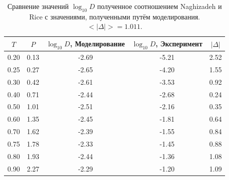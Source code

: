 \documentclass[a4paper,12pt]{article}
\begin{document}
\begin{table}[H]
    \centering
    \caption{Сравнение значений \(\log_{10} D\)
        полученное соотношением Naghizadeh и Rice с
        значениями, полученными путём моделирования.
    \(<|\Delta|> = 1.011\).}
    \begin{tabular}{| c | c| c | c | c| }
        \hline
        \(T\) & \(P\) &\(\log_{10} D\),  Моделирование & 
        \(\log_{10} D\), Эксперимент &
        \(|\Delta|\)\\
        \hline
        0.20 & 0.13 & -2.69 & -5.21 & 2.52 \\
        0.25 & 0.27 & -2.65 & -4.20 & 1.55 \\
        0.30 & 0.42 & -2.61 & -3.53 & 0.92 \\
        0.40 & 0.71 & -2.44 & -2.68 & 0.24 \\
        0.50 & 1.01 & -2.51 & -2.16 & 0.35 \\
        0.60 & 1.35 & -2.45 & -1.81 & 0.64 \\
        0.70 & 1.62 & -2.39 & -1.55 & 0.84 \\
        0.75 & 1.78 & -2.33 & -1.45 & 0.88 \\
        0.80 & 1.93 & -2.44 & -1.36 & 1.08 \\
        0.90 & 2.27 & -2.29 & -1.20 & 1.09 \\
        \hline
    \end{tabular}
\end{table}
\end{document}

